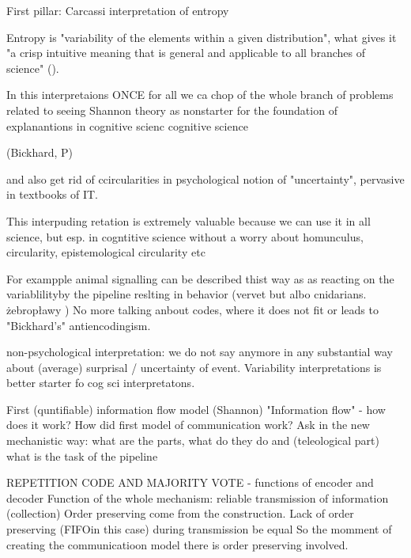 \documentclass[10pt, aspectratio=169]{beamer}
\begin{document}
\begin{frame} {First pillar: Carcassi interpretation of entropy}

Entropy is "variability of the elements within a given distribution", what gives it "a crisp intuitive meaning that is general and applicable to all branches of science" (\cite{carcassi_variability_2021}).

In this interpretaions ONCE for all we ca chop of the whole branch of problems related to seeing Shannon theory as nonstarter for the foundation of explanantions in cognitive scienc  cognitive science

(Bickhard, P)

and also get rid of ccircularities in psychological notion of "uncertainty", pervasive in textbooks of IT.

This interpuding retation is extremely valuable because we can use it in all science, but esp. in cogntitive science without a worry about homunculus, circularity, epistemological circularity etc

For exampple animal signalling can be described thist way as as reacting on the variablilityby the pipeline reslting in behavior (vervet but albo cnidarians. żebropławy )
No more talking anbout codes, where it does not fit or leads to "Bickhard's" antiencodingism. 

non-psychological interpretation: we do not say anymore in any substantial way about (average) surprisal / uncertainty of event.
Variability interpretations is better starter fo cog sci interpretatons.
 

\end{frame}



\begin{frame} {First (quntifiable) information flow model (Shannon)}
    "Information flow" - how does it work?
    How did first model of communication work?
    Ask in the new mechanistic way: what are the parts, what do they do and (teleological part) what is the task of the pipeline

    REPETITION CODE AND MAJORITY VOTE - functions of encoder and decoder 
    Function of the whole mechanism: reliable transmission of information (collection)
    Order preserving come from the construction.
    Lack of order preserving (FIFOin this case) during transmission  be equal 
    So the momment of creating the communicatioon model there is order preserving involved.
     
\end{frame}
\end{document}
